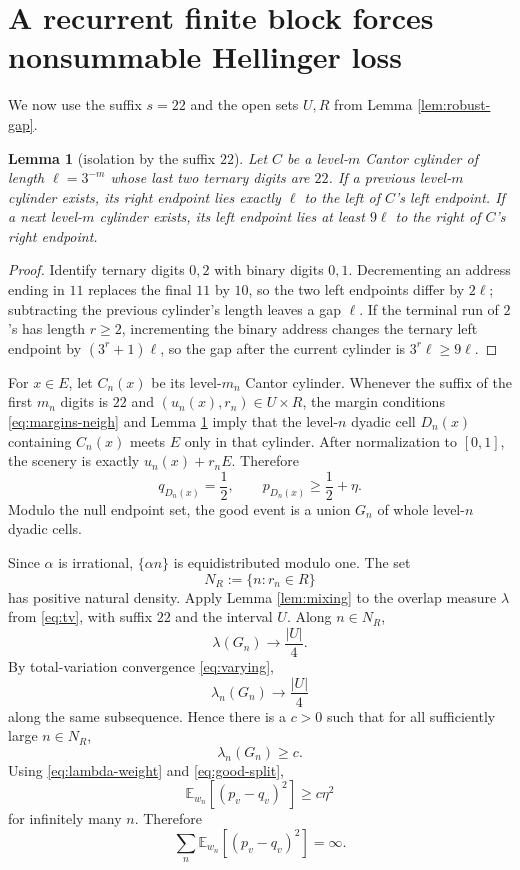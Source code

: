 \documentclass[11pt]{article}
\newtheorem{lemma}[theorem]{Lemma}
\theoremstyle{remark}
\newcommand{\E}{\mathbb E}
\begin{document}
\section{A recurrent finite block forces nonsummable Hellinger loss}

We now use the suffix $s=22$ and the open sets $U,R$ from Lemma \ref{lem:robust-gap}.

\begin{lemma}[isolation by the suffix $22$]\label{lem:isolate}
Let $C$ be a level-$m$ Cantor cylinder of length $\ell=3^{-m}$ whose last two ternary digits are $22$.  If a previous level-$m$ cylinder exists, its right endpoint lies exactly $\ell$ to the left of $C$'s left endpoint.  If a next level-$m$ cylinder exists, its left endpoint lies at least $9\ell$ to the right of $C$'s right endpoint.
\end{lemma}

\begin{proof}
Identify ternary digits $0,2$ with binary digits $0,1$.  Decrementing an address ending in $11$ replaces the final $11$ by $10$, so the two left endpoints differ by $2\ell$; subtracting the previous cylinder's length leaves a gap $\ell$.  If the terminal run of $2$'s has length $r\ge2$, incrementing the binary address changes the ternary left endpoint by $(3^r+1)\ell$, so the gap after the current cylinder is $3^r\ell\ge9\ell$.
\end{proof}

For $x\in E$, let $C_n(x)$ be its level-$m_n$ Cantor cylinder.  Whenever the suffix of the first $m_n$ digits is $22$ and $(u_n(x),r_n)\in U\times R$, the margin conditions \eqref{eq:margins-neigh} and Lemma \ref{lem:isolate} imply that the level-$n$ dyadic cell $D_n(x)$ containing $C_n(x)$ meets $E$ only in that cylinder.  After normalization to $[0,1]$, the scenery is exactly $u_n(x)+r_nE$.  Therefore
\begin{equation}\label{eq:good-split}
 q_{D_n(x)}=\frac12,\qquad
 p_{D_n(x)}\ge\frac12+\eta.
\end{equation}
Modulo the null endpoint set, the good event is a union $G_n$ of whole level-$n$ dyadic cells.

Since $\alpha$ is irrational, $\{\alpha n\}$ is equidistributed modulo one.  The set
\[
 N_R:=\{n:r_n\in R\}
\]
has positive natural density.  Apply Lemma \ref{lem:mixing} to the overlap measure $\lambda$ from \eqref{eq:tv}, with suffix $22$ and the interval $U$.  Along $n\in N_R$,
\[
 \lambda(G_n)\longrightarrow\frac{|U|}{4}.
\]
By total-variation convergence \eqref{eq:varying},
\[
 \lambda_n(G_n)\longrightarrow\frac{|U|}{4}
\]
along the same subsequence.  Hence there is a $c>0$ such that for all sufficiently large $n\in N_R$,
\[
 \lambda_n(G_n)\ge c.
\]
Using \eqref{eq:lambda-weight} and \eqref{eq:good-split},
\[
 \E_{w_n}[(p_v-q_v)^2]\ge c\eta^2
\]
for infinitely many $n$.  Therefore
\begin{equation}\label{eq:diverge}
 \sum_n\E_{w_n}[(p_v-q_v)^2]=\infty.
\end{equation}
\end{document}
